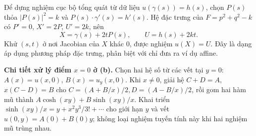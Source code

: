 Để dựng nghiệm cục bộ tổng quát từ dữ liệu $u(\gamma(s))=h(s)$, chọn $P(s)$ thỏa $|P(s)|^2=k$ và $P(s)\cdot\gamma'(s)=h'(s)$. Hệ đặc trưng của $F=p^2+q^2-k$ có $P'=0$, $X'=2P$, $U'=2k$, nên
\[X=\gamma(s)+2tP(s),\qquad U=h(s)+2kt.\]
Khử $(s,t)$ ở nơi Jacobian của $X$ khác 0, được nghiệm $u(X)=U$. Đây là dạng áp dụng phương pháp đặc trưng, phân biệt với chỉ đưa ra ví dụ affine.

\textbf{Chi tiết xử lý điểm $x=0$ ở (b).} Chọn hai hệ số từ các vết tại $y=0$: $A(x)=u(x,0)$, $B(x)=u_y(x,0)$. Khi $x\ne0$, giải hệ $C+D=A$, $x(C-D)=B$ cho $C=(A+B/x)/2,D=(A-B/x)/2$, rồi gom hai hàm mũ thành $A\cosh(xy)+B\sinh(xy)/x$. Khai triển $\sinh(xy)/x=y+x^2y^3/3!+\cdots$ cho giới hạn $y$ và vết $u(0,y)=A(0)+B(0)y$; không loại nghiệm tuyến tính này khi hai nghiệm mũ trùng nhau.
